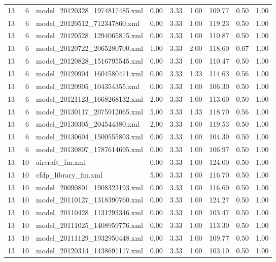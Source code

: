 \begin{table}[ht]
\begin{tabular}{rrlrrrrrr}
   13 &   6 & model\_20120328\_1974817485.xml & 0.00 & 3.33 & 1.00 & 109.77 & 0.50 & 1.00 \\ 
   13 &   6 & model\_20120512\_712347860.xml & 0.00 & 3.33 & 1.00 & 119.23 & 0.50 & 1.00 \\ 
   13 &   6 & model\_20120528\_1294065815.xml & 0.00 & 3.33 & 1.00 & 110.87 & 0.50 & 1.00 \\ 
   13 &   6 & model\_20120722\_2065280700.xml & 1.00 & 3.33 & 2.00 & 118.60 & 0.67 & 1.00 \\ 
   13 &   6 & model\_20120828\_1516795545.xml & 0.00 & 3.33 & 1.00 & 110.47 & 0.50 & 1.00 \\ 
   13 &   6 & model\_20120904\_1604580471.xml & 0.00 & 3.33 & 1.33 & 114.63 & 0.56 & 1.00 \\ 
   13 &   6 & model\_20120905\_104354355.xml & 0.00 & 3.33 & 1.00 & 106.30 & 0.50 & 1.00 \\ 
   13 &   6 & model\_20121123\_1668268132.xml & 2.00 & 3.33 & 1.00 & 113.60 & 0.50 & 1.00 \\ 
   13 &   6 & model\_20130117\_2075912065.xml & 5.00 & 3.33 & 1.33 & 118.70 & 0.56 & 1.00 \\ 
   13 &   6 & model\_20130305\_204544380.xml & 2.00 & 3.33 & 1.00 & 119.53 & 0.50 & 1.00 \\ 
   13 &   6 & model\_20130604\_1500555803.xml & 0.00 & 3.33 & 1.00 & 104.30 & 0.50 & 1.00 \\ 
   13 &   6 & model\_20130807\_1787614695.xml & 0.00 & 3.33 & 1.00 & 106.97 & 0.50 & 1.00 \\ 
   13 &  10 & aircraft\_fm.xml & 0.00 & 3.33 & 1.00 & 124.00 & 0.50 & 1.00 \\ 
   13 &  10 & cfdp\_library\_fm.xml & 5.00 & 3.33 & 1.00 & 116.70 & 0.50 & 1.00 \\ 
   13 &  10 & model\_20090801\_1908323193.xml & 0.00 & 3.33 & 1.00 & 116.60 & 0.50 & 1.00 \\ 
   13 &  10 & model\_20110127\_1318390760.xml & 0.00 & 3.33 & 1.00 & 124.27 & 0.50 & 1.00 \\ 
   13 &  10 & model\_20110428\_1131293346.xml & 0.00 & 3.33 & 1.00 & 103.47 & 0.50 & 1.00 \\ 
   13 &  10 & model\_20111025\_1408959776.xml & 0.00 & 3.33 & 1.00 & 113.30 & 0.50 & 1.00 \\ 
   13 &  10 & model\_20111129\_1932950448.xml & 0.00 & 3.33 & 1.00 & 109.77 & 0.50 & 1.00 \\ 
   13 &  10 & model\_20120314\_1438691117.xml & 0.00 & 3.33 & 1.00 & 103.10 & 0.50 & 1.00 \\ 

\end{tabular}
\end{table}
